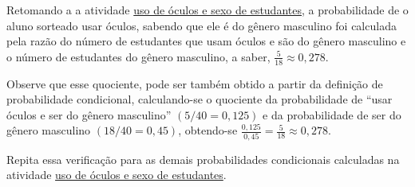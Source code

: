 Retomando a a atividade \hyperref[uso-oculos]{uso de óculos e sexo de estudantes}, a probabilidade de o aluno sorteado usar óculos, sabendo que ele é do gênero masculino foi calculada pela razão do número de estudantes que usam óculos e são do gênero masculino e o número de estudantes do gênero masculino, a saber, \(\frac{5}{18}\approx 0{,}278\).

Observe que esse quociente, pode ser também obtido a partir da definição de probabilidade condicional, calculando-se o quociente da probabilidade de “usar óculos e ser do gênero masculino” $(5/40=0{,}125)$ e da probabilidade de ser do gênero masculino $(18/40=0{,}45)$, obtendo-se \(\displaystyle{\frac{0,125}{0,45}=\frac{5}{18}\approx 0{,}278}\).

Repita essa verificação para as demais probabilidades condicionais calculadas na atividade \hyperref[uso-oculos]{uso de óculos e sexo de estudantes}.


